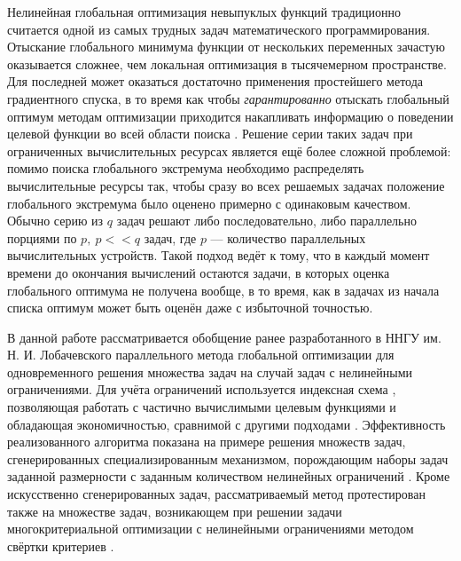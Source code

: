 \documentclass[11pt, oneside, a4paper]{article}
\begin{document}
Нелинейная глобальная оптимизация невыпуклых функций традиционно считается одной из самых трудных
задач математического программирования. Отыскание глобального минимума функции от нескольких переменных
зачастую оказывается сложнее, чем локальная оптимизация в тысячемерном пространстве. Для последней может оказаться достаточно
применения простейшего метода градиентного спуска, в то время как чтобы \textit{гарантированно} отыскать глобальный оптимум методам
оптимизации приходится накапливать информацию о поведении целевой функции во всей области поиска \cite{Jones2009,Paulavicius2011,Evtushenko2013,Strongin2000}. Решение серии таких задач при ограниченных вычислительных
ресурсах является ещё более сложной проблемой: помимо поиска глобального экстремума необходимо
распределять вычислительные ресурсы так, чтобы сразу во всех решаемых задачах положение глобального
экстремума было оценено примерно с одинаковым качеством. Обычно серию из \(q\) задач решают либо последовательно, либо
параллельно порциями по \(p,\:p<<q\) задач, где \(p\) --- количество параллельных вычислительных устройств.
Такой подход ведёт к тому, что в каждый момент времени до окончания вычислений
остаются задачи, в которых оценка глобального оптимума не получена вообще, в то время, как в задачах из начала
списка оптимум может быть оценён даже с избыточной точностью.

В данной работе рассматривается обобщение ранее разработанного в ННГУ им. Н. И. Лобачевского
параллельного метода глобальной оптимизации для одновременного решения множества задач \cite{BarkalovStrongin2018} на
случай задач с нелинейными ограничениями. Для учёта ограничений используется индексная схема \cite{Strongin2000},
позволяющая работать с частично вычислимыми целевым функциями и обладающая экономичностью,
сравнимой с другими подходами \cite{BarkalovLebedev2017}. Эффективность реализованного
алгоритма показана на примере решения множеств задач, сгенерированных специализированным
механизмом, порождающим наборы задач заданной размерности с заданным количеством нелинейных ограничений \cite{GergelBarkalov2019}.
Кроме искусственно сгенерированных задач, рассматриваемый метод протестирован также
на множестве задач, возникающем при решении задачи многокритериальной оптимизации
с нелинейными ограничениями методом свёртки критериев \cite{Ehrgott2005}.
\end{document}
